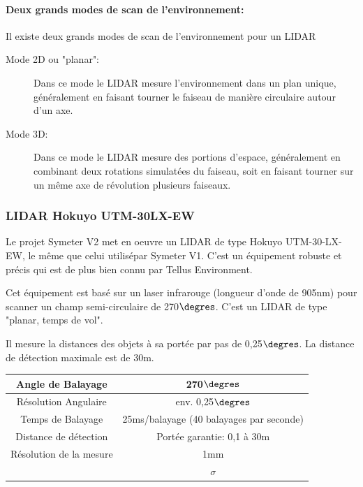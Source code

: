 \documentclass[12pt,a4paper]{report}
\begin{document}
		\paragraph*{Deux grands modes de scan de l'environnement:} Il existe deux grands modes de scan de l'environnement pour un LIDAR
		
		\begin{description}
			\item[Mode 2D ou  "planar":] Dans ce mode le LIDAR mesure l'environnement dans un plan unique, généralement en faisant tourner le faiseau de manière circulaire autour d'un axe.
			\item[Mode 3D:] Dans ce mode le LIDAR mesure des portions d'espace, généralement en combinant deux rotations simulatées du faiseau, soit en faisant tourner sur un même axe de révolution plusieurs faiseaux.
		\end{description}
	
		
		\subsubsection{LIDAR Hokuyo UTM-30LX-EW}
		Le projet Symeter V2 met en oeuvre un LIDAR de type Hokuyo UTM-30-LX-EW, le même que celui utilisépar Symeter V1. C'est un équipement robuste et précis qui est de plus bien connu par Tellus Environment.
		
		\para Cet équipement est basé sur un laser infrarouge (longueur d'onde de 905nm) pour scanner un champ semi-circulaire de 270$\degres$. C'est un LIDAR de type "planar, temps de vol".
		
		\para Il mesure la distances des objets à sa portée par pas de 0,25$\degres$. La distance de détection maximale est de 30m.
		\newline
		
		\begin{tabular}{|c|c|}
			\hline 
			Angle de Balayage & 270$\degres$ \\ 
			\hline 
			Résolution Angulaire & env. 0,25$\degres$ \\ 
			\hline
			Temps de Balayage & 25ms/balayage (40 balayages par seconde) \\
			\hline
			Distance de détection & Portée garantie: 0,1 à 30m \\
			\hline
			Résolution de la mesure & 1mm \\
			& $\sigma$ \\
			\hline
		\end{tabular} 
	
\end{document}
